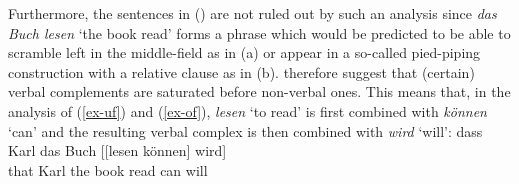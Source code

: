 Furthermore, the sentences in () are not ruled out by such an analysis since \emph{das Buch
  lesen} `the book read' forms a phrase which would be predicted to be able to scramble left in the
middle-field as in (a) or appear in a so-called pied-piping construction with a relative
clause as in (b).
\eal
{}
\zl
%
\citet*{HN94a} therefore suggest that (certain) verbal complements are
saturated before non-verbal ones. This means that, in the analysis of (\ref{ex-uf}) and
(\ref{ex-of}), \emph{lesen} `to read' is first combined with \emph{können} `can' and the resulting
verbal complex is then combined with \emph{wird} `will':
\ea
\gll dass Karl das Buch [[lesen können] wird]\\
     that Karl the book \hspaceThis{[[}read can will\\
\z
